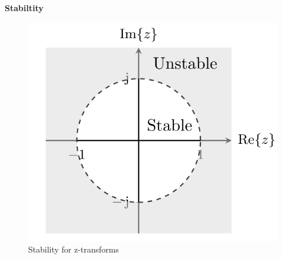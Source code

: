 \textbf{Stabiltity}
\begin{figure}[!h]
   \centering
   \includegraphics[width=12cm]{image/stability_z-transform.png} 
   \caption{Stability for z-transforms}
   \label{fig:stability_z-transform}
\end{figure}

